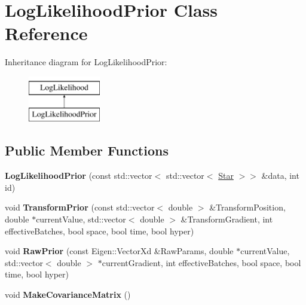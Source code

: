\hypertarget{classLogLikelihoodPrior}{}\section{Log\+Likelihood\+Prior Class Reference}
\label{classLogLikelihoodPrior}
Inheritance diagram for Log\+Likelihood\+Prior\+:\begin{figure}[H]
\begin{center}
\leavevmode
\includegraphics[height=2.000000cm]{classLogLikelihoodPrior}
\end{center}
\end{figure}
\subsection*{Public Member Functions}
\begin{DoxyCompactItemize}
\item 
\mbox{\label{classLogLikelihoodPrior_a5aa0180264b8be7d7f4bf842bf3fc763}} 
{\bfseries Log\+Likelihood\+Prior} (const std\+::vector$<$ std\+::vector$<$ \hyperlink{classStar}{Star} $>$$>$ \&data, int id)
\item 
\mbox{\label{classLogLikelihoodPrior_ac3213ddda043b381b0175ffd89445180}} 
void {\bfseries Transform\+Prior} (const std\+::vector$<$ double $>$ \&Transform\+Position, double $\ast$current\+Value, std\+::vector$<$ double $>$ \&Transform\+Gradient, int effective\+Batches, bool space, bool time, bool hyper)
\item 
\mbox{\label{classLogLikelihoodPrior_ae3178e88d84bd9602a451d5742bc3538}} 
void {\bfseries Raw\+Prior} (const Eigen\+::\+Vector\+Xd \&Raw\+Params, double $\ast$current\+Value, std\+::vector$<$ double $>$ $\ast$current\+Gradient, int effective\+Batches, bool space, bool time, bool hyper)
\item 
\mbox{\label{classLogLikelihoodPrior_a218acdef04bef419aebc1f5870469b42}} 
void {\bfseries Make\+Covariance\+Matrix} ()
\end{DoxyCompactItemize}
